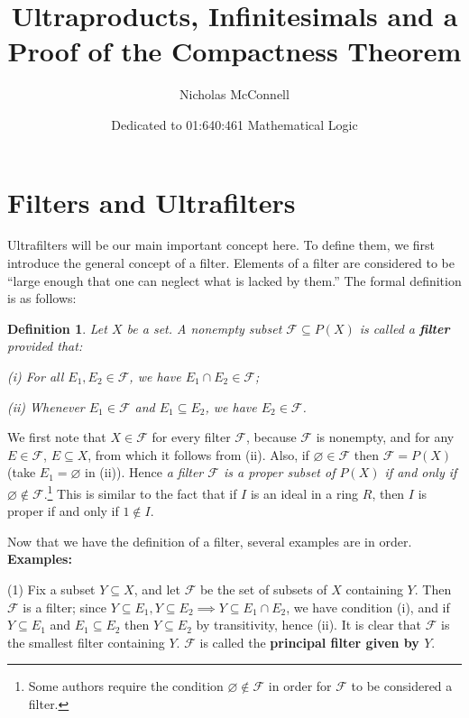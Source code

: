 \documentclass{article}
\title{Ultraproducts, Infinitesimals and a Proof of the Compactness Theorem}
\author{Nicholas McConnell}
\date{Dedicated to 01:640:461 Mathematical Logic}
\def\F{\mathscr F}
\begin{document}
\maketitle

\newtheorem*{definition}{Definition}
\newtheorem{axiom}{Axiom}
\newtheorem{proposition}{Proposition}
\newtheorem{exercise}{Exercise}
\newtheorem{theorem}{Theorem}
\newtheorem{propdef}{Proposition and definition}
\newtheorem{corollary}{Corollary}
\newtheorem{lemma}{Lemma}

\section*{Filters and Ultrafilters}
Ultrafilters will be our main important concept here.  To define them, we first introduce the general concept of a filter.  Elements of a filter are considered to be ``large enough that one can neglect what is lacked by them.''  The formal definition is as follows:

\theoremstyle{definition}
\begin{definition}
Let $X$ be a set.  A nonempty subset $\F\subseteq P(X)$ is called a \textbf{filter} provided that:

(i) For all $E_1,E_2\in\F$, we have $E_1\cap E_2\in\F$;

(ii) Whenever $E_1\in\F$ and $E_1\subseteq E_2$, we have $E_2\in\F$.
\end{definition}

\noindent We first note that $X\in\F$ for every filter $\F$, because $\F$ is nonempty, and for any $E\in\F$, $E\subseteq X$, from which it follows from (ii).  Also, if $\varnothing\in\F$ then $\F=P(X)$ (take $E_1=\varnothing$ in (ii)).  Hence \emph{a filter $\F$ is a proper subset of $P(X)$ if and only if $\varnothing\notin\F$}.\footnote{Some authors require the condition $\varnothing\notin\F$ in order for $\F$ to be considered a filter.}  This is similar to the fact that if $I$ is an ideal in a ring $R$, then $I$ is proper if and only if $1\notin I$.

Now that we have the definition of a filter, several examples are in order.\\

\noindent\textbf{Examples:}

(1) Fix a subset $Y\subseteq X$, and let $\F$ be the set of subsets of $X$ containing $Y$.  Then $\F$ is a filter; since $Y\subseteq E_1,Y\subseteq E_2\implies Y\subseteq E_1\cap E_2$, we have condition (i), and if $Y\subseteq E_1$ and $E_1\subseteq E_2$ then $Y\subseteq E_2$ by transitivity, hence (ii).  It is clear that $\F$ is the smallest filter containing $Y$.  $\mathcal F$ is called the \textbf{principal filter given by $Y$}.
\end{document}
